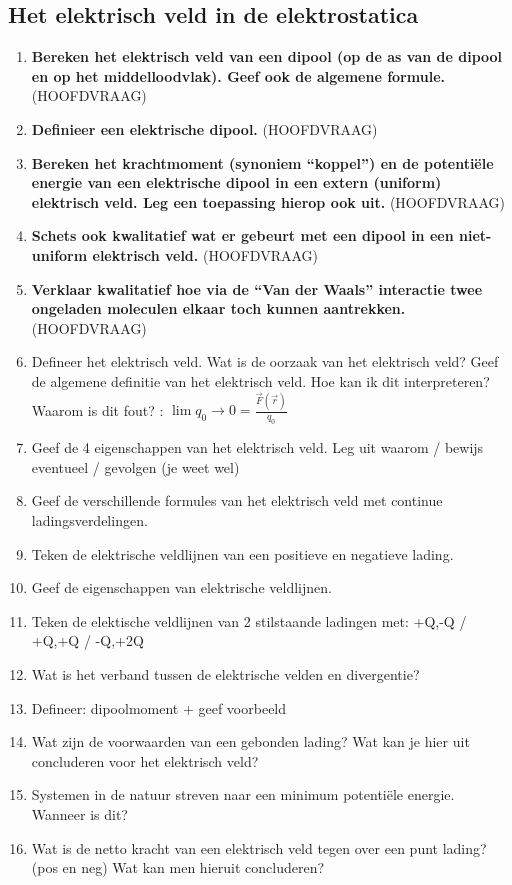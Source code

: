 \documentclass[12pt]{article}
\begin{document}
    \subsection{Het elektrisch veld in de elektrostatica}
    \begin{enumerate}
        \item \textbf{Bereken het elektrisch veld van een dipool (op de as van de dipool en op het middelloodvlak). Geef ook de algemene formule.} (HOOFDVRAAG)
        \item \textbf{Definieer een elektrische dipool.} (HOOFDVRAAG)
        \item \textbf{Bereken het krachtmoment (synoniem “koppel”) en de potentiële energie van een elek­trische dipool in een extern (uniform) elektrisch veld. Leg een toepassing hierop ook uit.} (HOOFDVRAAG)
        \item \textbf{Schets ook kwalitatief wat er gebeurt met een dipool in een niet-uniform elektrisch veld.} (HOOFDVRAAG)
        \item \textbf{Verklaar kwalitatief hoe via de “Van der Waals” interactie twee ongeladen moleculen elkaar toch kunnen aantrekken.} (HOOFDVRAAG)
        \item Defineer het elektrisch veld. Wat is de oorzaak van het elektrisch veld? Geef de algemene definitie van het elektrisch veld. Hoe kan ik dit interpreteren? Waarom is dit fout? : $\lim{q_0 \to 0} = \frac{\vec{F}(\vec{r})}{q_0}$
        \item Geef de 4 eigenschappen van het elektrisch veld. Leg uit waarom / bewijs eventueel / gevolgen (je weet wel)
        \item Geef de verschillende formules van het elektrisch veld met continue ladingsverdelingen.
        \item Teken de elektrische veldlijnen van een positieve en negatieve lading.
        \item Geef de eigenschappen van elektrische veldlijnen.
        \item Teken de elektische veldlijnen van 2 stilstaande ladingen met: +Q,-Q / +Q,+Q / -Q,+2Q
        \item Wat is het verband tussen de elektrische velden en divergentie?                                                                             
        \item Defineer: dipoolmoment + geef voorbeeld
        \item Wat zijn de voorwaarden van een gebonden lading? Wat kan je hier uit concluderen voor het elektrisch veld?
        \item Systemen in de natuur streven naar een minimum potentiële energie. Wanneer is dit?
        \item Wat is de netto kracht van een elektrisch veld tegen over een punt lading? (pos en neg) Wat kan men hieruit concluderen?
    \end{enumerate}
\end{document}
